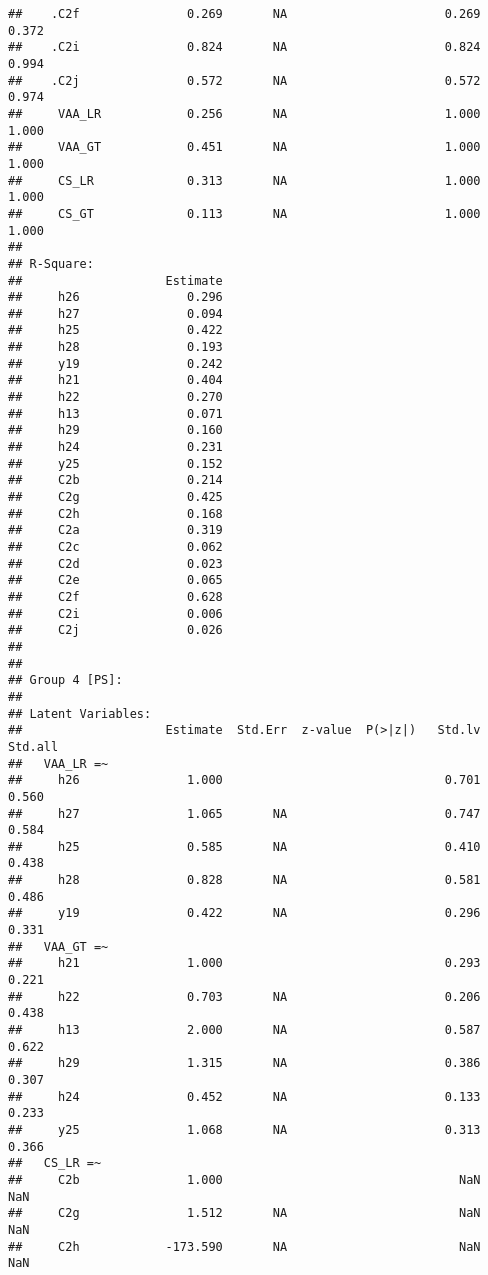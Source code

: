 \documentclass[
]{article}
\begin{document}
\begin{verbatim}
##    .C2f               0.269       NA                      0.269    0.372
##    .C2i               0.824       NA                      0.824    0.994
##    .C2j               0.572       NA                      0.572    0.974
##     VAA_LR            0.256       NA                      1.000    1.000
##     VAA_GT            0.451       NA                      1.000    1.000
##     CS_LR             0.313       NA                      1.000    1.000
##     CS_GT             0.113       NA                      1.000    1.000
## 
## R-Square:
##                    Estimate
##     h26               0.296
##     h27               0.094
##     h25               0.422
##     h28               0.193
##     y19               0.242
##     h21               0.404
##     h22               0.270
##     h13               0.071
##     h29               0.160
##     h24               0.231
##     y25               0.152
##     C2b               0.214
##     C2g               0.425
##     C2h               0.168
##     C2a               0.319
##     C2c               0.062
##     C2d               0.023
##     C2e               0.065
##     C2f               0.628
##     C2i               0.006
##     C2j               0.026
## 
## 
## Group 4 [PS]:
## 
## Latent Variables:
##                    Estimate  Std.Err  z-value  P(>|z|)   Std.lv  Std.all
##   VAA_LR =~                                                             
##     h26               1.000                               0.701    0.560
##     h27               1.065       NA                      0.747    0.584
##     h25               0.585       NA                      0.410    0.438
##     h28               0.828       NA                      0.581    0.486
##     y19               0.422       NA                      0.296    0.331
##   VAA_GT =~                                                             
##     h21               1.000                               0.293    0.221
##     h22               0.703       NA                      0.206    0.438
##     h13               2.000       NA                      0.587    0.622
##     h29               1.315       NA                      0.386    0.307
##     h24               0.452       NA                      0.133    0.233
##     y25               1.068       NA                      0.313    0.366
##   CS_LR =~                                                              
##     C2b               1.000                                 NaN      NaN
##     C2g               1.512       NA                        NaN      NaN
##     C2h            -173.590       NA                        NaN      NaN

\end{verbatim}
\end{document}
